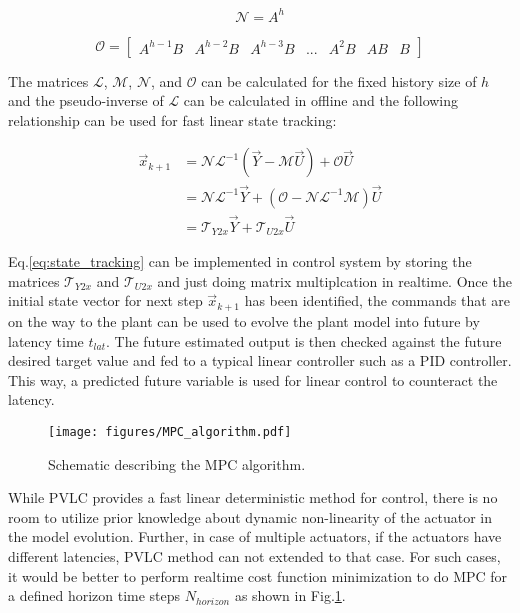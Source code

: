 \begin{equation}
    \mathcal{N} = A^{h}
\end{equation}
    
\begin{equation}
    \mathcal{O} = \begin{bmatrix} A^{h-1} B & A^{h-2} B & A^{h-3} B & ... & A^2 B & AB & B \end{bmatrix}
\end{equation}

The matrices $\mathcal{L}$, $\mathcal{M}$, $\mathcal{N}$, and $\mathcal{O}$ can be calculated for the fixed history size of $h$ and the pseudo-inverse of $\mathcal{L}$ can be calculated in offline and the following relationship can be used for fast linear state tracking:

\begin{equation}
    \begin{split}
\vec{x}_{k+1} &= \mathcal{N} \mathcal{L}^{-1} (\vec{Y} - \mathcal{M} \vec{U}) + \mathcal{O} \vec{U}\\
              &= \mathcal{N} \mathcal{L}^{-1} \vec{Y} + (\mathcal{O} - \mathcal{N} \mathcal{L}^{-1} \mathcal{M})\vec{U} \\
              &= \mathcal{T}_{Y2x} \vec{Y} + \mathcal{T}_{U2x} \vec{U}
    \end{split}
\label{eq:state_tracking}
\end{equation}

Eq.\ref{eq:state_tracking} can be implemented in control system by storing the matrices $\mathcal{T}_{Y2x}$ and $\mathcal{T}_{U2x}$ and just doing matrix multiplcation in realtime. Once the initial state vector for next step $\vec{x}_{k+1}$ has been identified, the commands that are on the way to the plant can be used to evolve the plant model into future by latency time $t_{lat}$. The future estimated output is then checked against the future desired target value and fed to a typical linear controller such as a PID controller. This way, a predicted future variable is used for linear control to counteract the latency.

\begin{figure}[!h]
 \centering
 \texttt{[image: figures/MPC\_algorithm.pdf]}
 \caption{Schematic describing the \ac{MPC} algorithm.}
 \label{fig:mpc}
\end{figure}

While \ac{PVLC} provides a fast linear deterministic method for control, there is no room to utilize prior knowledge about dynamic non-linearity of the actuator in the model evolution. Further, in case of multiple actuators, if the actuators have different latencies, PVLC method can not extended to that case. For such cases, it would be better to perform realtime cost function minimization to do \ac{MPC} for a defined horizon time steps $N_{horizon}$ as shown in Fig.\ref{fig:mpc}.

